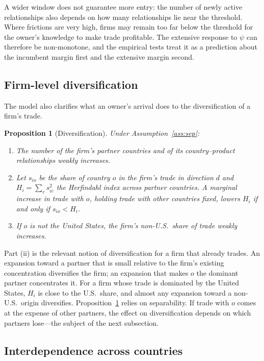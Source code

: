 \documentclass[12pt]{article}
\newtheorem{proposition}{Proposition}
\theoremstyle{remark}
\begin{document}
\noindent A wider window does not guarantee more entry: the number of
newly active relationships also depends on how many relationships lie near
the threshold. Where frictions are very high, firms may remain too far below
the threshold for the owner's knowledge to make trade profitable. The extensive
response to $\psi$ can therefore be non-monotone, and the empirical tests
treat it as a prediction about the incumbent margin first and the extensive
margin second.

\subsection{Firm-level diversification}

The model also clarifies what an owner's arrival does to the diversification
of a firm's trade.

\begin{proposition}[Diversification]\label{prop:divers}
Under Assumption~\ref{ass:sep}:
\begin{enumerate}[label=(\roman*),itemsep=0.1em]
\item The number of the firm's partner countries and of its country--product
relationships weakly increases.
\item Let $s_{io}$ be the share of country $o$ in the firm's trade in direction
$d$ and $H_i=\sum_c s_{ic}^2$ the Herfindahl index across partner countries. A
marginal increase in trade with $o$, holding trade with other countries fixed,
lowers $H_i$ if and only if $s_{io}<H_i$.
\item If $o$ is not the United States, the firm's non-U.S.\ share of trade
weakly increases.
\end{enumerate}
\end{proposition}

\noindent Part (ii) is the relevant notion of diversification for a firm that
already trades. An expansion toward a partner that is small relative to the
firm's existing concentration diversifies the firm; an expansion that makes
$o$ the dominant partner concentrates it. For a firm whose trade is dominated
by the United States, $H_i$ is close to the U.S.\ share, and almost any
expansion toward a non-U.S.\ origin diversifies. Proposition~\ref{prop:divers}
relies on separability. If trade with $o$ comes at the expense of other
partners, the effect on diversification depends on which partners lose---the
subject of the next subsection.

\subsection{Interdependence across countries}
\label{sec:interdep}
\end{document}
